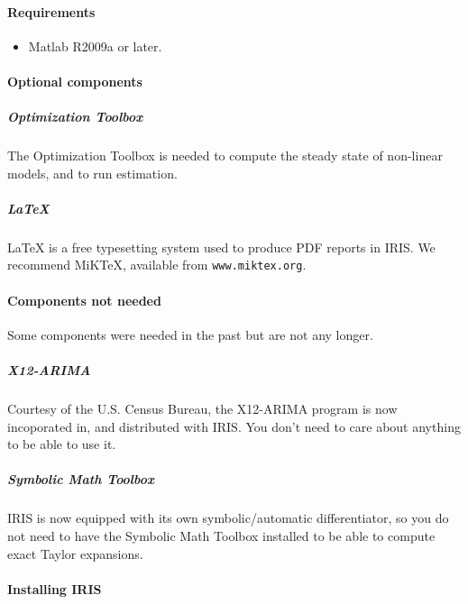 

	\paragraph{Requirements}\label{requirements}

\begin{itemize}
\itemsep1pt\parskip0pt
\item
  Matlab R2009a or later.
\end{itemize}

\paragraph{Optional components}\label{optional-components}

\subparagraph{Optimization Toolbox}\label{optimization-toolbox}

The Optimization Toolbox is needed to compute the steady state of
non-linear models, and to run estimation.

\subparagraph{LaTeX}\label{latex}

LaTeX is a free typesetting system used to produce PDF reports in IRIS.
We recommend MiKTeX, available from \texttt{www.miktex.org}.

\paragraph{Components not needed}\label{components-not-needed}

Some components were needed in the past but are not any longer.

\subparagraph{X12-ARIMA}\label{x12-arima}

Courtesy of the U.S. Census Bureau, the X12-ARIMA program is now
incoporated in, and distributed with IRIS. You don't need to care about
anything to be able to use it.

\subparagraph{Symbolic Math Toolbox}\label{symbolic-math-toolbox}

IRIS is now equipped with its own symbolic/automatic differentiator, so
you do not need to have the Symbolic Math Toolbox installed to be able
to compute exact Taylor expansions.

\paragraph{Installing IRIS}\label{installing-iris}

